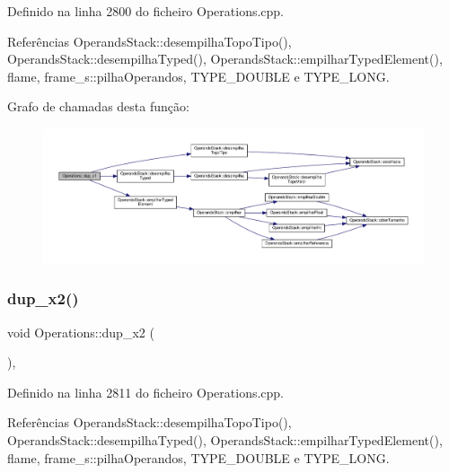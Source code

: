 Definido na linha 2800 do ficheiro Operations.\+cpp.



Referências Operands\+Stack\+::desempilha\+Topo\+Tipo(), Operands\+Stack\+::desempilha\+Typed(), Operands\+Stack\+::empilhar\+Typed\+Element(), flame, frame\+\_\+s\+::pilha\+Operandos, T\+Y\+P\+E\+\_\+\+D\+O\+U\+B\+LE e T\+Y\+P\+E\+\_\+\+L\+O\+NG.

Grafo de chamadas desta função\+:
\nopagebreak
\begin{figure}[H]
\begin{center}
\leavevmode
\includegraphics[width=350pt]{classOperations_a46bab81a4a4bd1eda1c89b0b74f9e014_cgraph}
\end{center}
\end{figure}
\mbox{\label{classOperations_adbba871c60bfb34344f2012936beeb25}} 
\subsubsection{\texorpdfstring{dup\+\_\+x2()}{dup\_x2()}}
{\footnotesize\ttfamily void Operations\+::dup\+\_\+x2 (\begin{DoxyParamCaption}{ }\end{DoxyParamCaption})\hspace{0.3cm}{\ttfamily [static]}, {\ttfamily [private]}}



Definido na linha 2811 do ficheiro Operations.\+cpp.



Referências Operands\+Stack\+::desempilha\+Topo\+Tipo(), Operands\+Stack\+::desempilha\+Typed(), Operands\+Stack\+::empilhar\+Typed\+Element(), flame, frame\+\_\+s\+::pilha\+Operandos, T\+Y\+P\+E\+\_\+\+D\+O\+U\+B\+LE e T\+Y\+P\+E\+\_\+\+L\+O\+NG.

